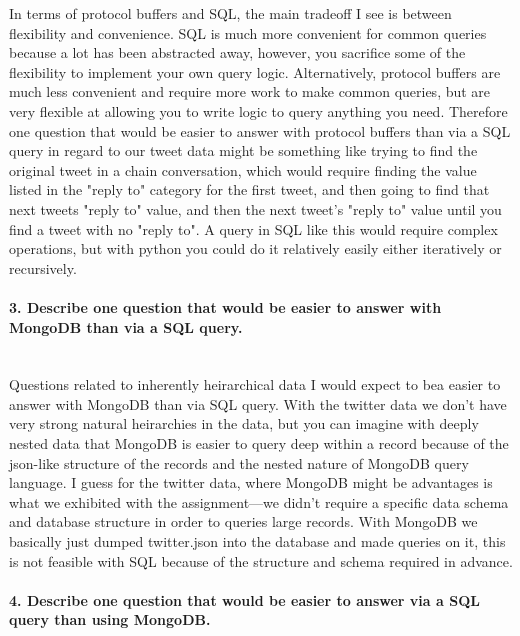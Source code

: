 \documentclass[12pt]{article}
\begin{document}
In terms of protocol buffers and SQL, the main tradeoff I see is between flexibility and convenience.  SQL is much more convenient for common queries because a lot has been abstracted away, however, you sacrifice some of the flexibility to implement your own query logic.  Alternatively, protocol buffers are much less convenient and require more work to make common queries, but are very flexible at allowing you to write logic to query anything you need.  Therefore one question that would be easier to answer with protocol buffers than via a SQL query in regard to our tweet data might be something like trying to find the original tweet in a chain conversation, which would require finding the value listed in the "reply to" category for the first tweet, and then going to find that next tweets "reply to" value, and then the next tweet's "reply to" value until you find a tweet with no "reply to".  A query in SQL like this would require complex operations, but with python you could do it relatively easily either iteratively or recursively.    

\paragraph{3. Describe one question that would be easier to answer with MongoDB than via a SQL query.}\mbox{}\\

Questions related to inherently heirarchical data I would expect to bea easier to answer with MongoDB than via SQL query. With the twitter data we don't have very strong natural heirarchies in the data, but you can imagine with deeply nested data that MongoDB is easier to query deep within a record because of the json-like structure of the records and the nested nature of MongoDB query language. I guess for the twitter data, where MongoDB might be advantages is what we exhibited with the assignment—we didn't require a specific data schema and database structure in order to queries large records.  With MongoDB we basically just dumped twitter.json into the database and made queries on it, this is not feasible with SQL because of the structure and schema required in advance. 

\paragraph{4. Describe one question that would be easier to answer via a SQL query than using MongoDB.}\mbox{}\\
\end{document}
